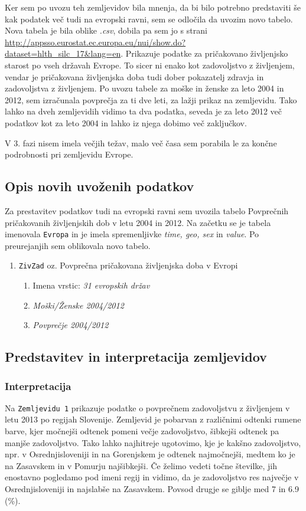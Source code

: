 \documentclass[11pt,a4paper]{article}
\begin{document}
Ker sem po uvozu teh zemljevidov bila mnenja, da bi bilo potrebno predstaviti še kak podatek več tudi na evropski ravni, sem se odločila da uvozim novo tabelo. Nova tabela je bila oblike \textit{.csv}, dobila pa sem jo s strani \url{http://appsso.eurostat.ec.europa.eu/nui/show.do?dataset=hlth_silc_17&lang=en}. Prikazuje podatke za pri\-ča\-ko\-va\-no življenjsko starost po vseh državah Evrope. To sicer ni enako kot zadovoljstvo z življenjem, vendar je pričakovana življenjska doba tudi dober pokazatelj zdravja in zadovoljstva z življenjem. Po uvozu tabele za moške in ženske za leto 2004 in 2012, sem izračunala povprečja za ti dve leti, za lažji prikaz na zemljevidu.  Tako lahko na dveh zemljevidih vidimo ta dva podatka, seveda je za leto 2012 več podatkov kot za leto 2004 in lahko iz njega dobimo več zaključkov.

V 3. fazi nisem imela večjih težav, malo več časa sem porabila le za končne podrobnosti pri zemljevidu Evrope.
\subsection{Opis novih uvoženih podatkov}
Za prestavitev podatkov tudi na evropski ravni sem uvozila tabelo Povprečnih pričakovanih življenjskih dob v letu 2004 in 2012. Na začetku se je tabela imenovala \verb+Evropa+ in je imela spremenljivke \textit{time, geo, sex} in \textit{value}. Po preurejanjih sem oblikovala novo tabelo.
\begin{enumerate}
\item \verb+ZivZad+ oz. Povprečna pričakovana življenjska doba v Evropi
\begin{enumerate}
\item Imena vrstic: \textit{31 evropskih držav}
\item \textit{Moški/Ženske 2004/2012} 
\item \textit{Povprečje 2004/2012} 
\end{enumerate}
\end{enumerate}

\subsection{Predstavitev in interpretacija zemljevidov}
\subsubsection{Interpretacija}
Na \verb+Zemljevidu 1+ prikazuje podatke o povprečnem zadovoljstvu z življenjem v letu 2013 po regijah Slovenije. Zemljevid je pobarvan z različnimi odtenki rumene barve, kjer močnejši odtenek pomeni večje zadovoljstvo, šibkejši odtenek pa manjše zadovoljstvo. Tako lahko najhitreje ugotovimo, kje je kakšno zadovoljstvo, npr. v Osrednjisloveniji in na Gorenjskem je odtenek najmočnejši, medtem ko je na Zasavskem in v Pomurju najšibkejši. Če želimo vedeti točne številke, jih enostavno pogledamo pod imeni regij in vidimo, da je zadovoljstvo res največje v Osrednjisloveniji in najslabše na Zasavskem. Povsod drugje se giblje med 7 in 6.9 (\%).

\end{document}

